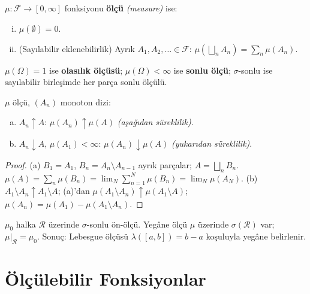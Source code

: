 \begin{tanim}[Ölçü]\label{app:def:olcu}
$\mu:\mathcal{F}\to[0,\infty]$ fonksiyonu \textbf{ölçü} \emph{(measure)} ise:
\begin{enumerate}[(i)]
  \item $\mu(\emptyset)=0$.
  \item (Sayılabilir eklenebilirlik) Ayrık $A_1,A_2,\ldots\in\mathcal{F}$: $\mu\!\left(\bigsqcup_n A_n\right)=\sum_n\mu(A_n)$.
\end{enumerate}
$\mu(\Omega)=1$ ise \textbf{olasılık ölçüsü}; $\mu(\Omega)<\infty$ ise \textbf{sonlu ölçü}; $\sigma$-sonlu ise sayılabilir birleşimde her parça sonlu ölçülü.
\end{tanim}

\begin{teorem}\label{app:thm:olcu_surekli}
$\mu$ ölçü, $(A_n)$ monoton dizi:
\begin{enumerate}[(a)]
  \item $A_n\uparrow A$: $\mu(A_n)\uparrow\mu(A)$ \emph{(aşağıdan süreklilik)}.
  \item $A_n\downarrow A$, $\mu(A_1)<\infty$: $\mu(A_n)\downarrow\mu(A)$ \emph{(yukarıdan süreklilik)}.
\end{enumerate}
\end{teorem}

\begin{proof}
(a) $B_1=A_1$, $B_n=A_n\setminus A_{n-1}$ ayrık parçalar; $A=\bigsqcup_n B_n$. $\mu(A)=\sum_n\mu(B_n)=\lim_N\sum_{n=1}^N\mu(B_n)=\lim_N\mu(A_N)$.
(b) $A_1\setminus A_n\uparrow A_1\setminus A$; (a)'dan $\mu(A_1\setminus A_n)\uparrow\mu(A_1\setminus A)$; $\mu(A_n)=\mu(A_1)-\mu(A_1\setminus A_n)$.
\end{proof}

\begin{teorem}\label{app:thm:caratheodory}
$\mu_0$ halka $\mathcal{R}$ üzerinde $\sigma$-sonlu ön-ölçü. Yegâne ölçü $\mu$ üzerinde $\sigma(\mathcal{R})$ var; $\mu|_\mathcal{R}=\mu_0$. Sonuç: Lebesgue ölçüsü $\lambda([a,b])=b-a$ koşuluyla yegâne belirlenir.
\end{teorem}

\section{Ölçülebilir Fonksiyonlar}
\label{app:olculebilir_fon}

